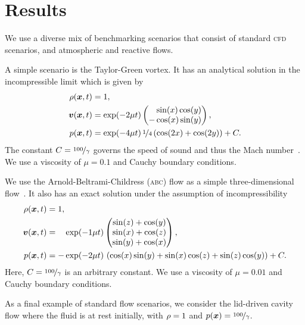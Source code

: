 \documentclass[runningheads]{llncs}
\begin{document}
\section{Results}
We use a diverse mix of benchmarking scenarios that consist of standard \textsc{cfd} scenarios, and atmospheric and reactive flows.

A simple scenario is the Taylor-Green vortex.
It has an analytical solution in the incompressible limit which is given by
\begin{align}
  \label{eq:taylor-green}
  \begin{split}
  \rho(\bm{x}, t) &= 1,\\
  \bm{v}(\bm{x}, t) &= \exp(-2 \mu t)
  \begin{pmatrix}
    \phantom{-}\sin(x) \cos(y) \\
- \cos(x) \sin(y) 
    \end{pmatrix}, \\
  p(\bm{x}, t) &= \exp(-4 \mu t) \, \nicefrac{1}{4} \left( \cos(2x) + \cos(2y) \right) + C.
  \end{split}
\end{align}
The constant $C = \nicefrac{100}{\gamma}$ governs the speed of sound and thus the Mach number~\cite{dumbser2016high}.
We use a viscosity of $\mu = 0.1$ and Cauchy boundary conditions.

We use the Arnold-Beltrami-Childress (\textsc{abc}) flow as a simple three-dimensional flow~\cite{tavelli2016staggered}.
It also has an exact solution under the assumption of incompressibility
\begin{align}
  \label{eq:abc-flow}
  \begin{split}
  \rho(\bm{x}, t) &= 1,\\
  \bm{v}(\bm{x}, t) &= \phantom{-} \exp(-1\mu t)
  \begin{pmatrix}
    \sin(z) + \cos(y)\\
    \sin(x) + \cos(z)\\
    \sin(y) + \cos(x)
  \end{pmatrix}, \\
  p(\bm{x}, t) &= -\exp(-2 \mu t) \, \left(\cos(x)\sin(y) + \sin(x)\cos(z) + \sin(z)\cos(y)\right)
  + C.
  \end{split}
\end{align}
Here, $C = \nicefrac{100}{\gamma}$ is an arbitrary constant.
We use a viscosity of $\mu = 0.01$ and Cauchy boundary conditions.

As a final example of standard flow scenarios, we consider the lid-driven cavity flow where the fluid is at rest initially, with $\rho = 1$ and $ p(\bm{x}) = \nicefrac{100}{\gamma}$.
\end{document}

